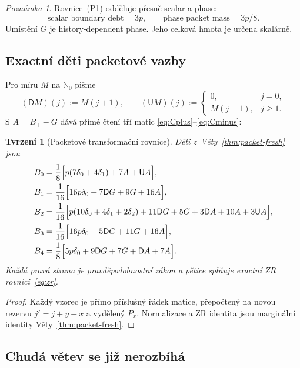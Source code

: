 \documentclass[11pt,a4paper]{article}
\newtheorem{proposition}[theorem]{Tvrzení}
\theoremstyle{definition}
\theoremstyle{remark}
\newtheorem{remark}[theorem]{Poznámka}
\newcommand{\Nzero}{\mathbb N_0}
\newcommand{\DOWN}{\mathsf D}
\newcommand{\UP}{\mathsf U}
\begin{document}
\begin{remark}
\label{rem:packet-scalar-phase}
Rovnice~(P1) odd\v eluje p\v resn\v e scalar a phase:
\[
\boxed{\text{scalar boundary debt}=3p,\qquad
       \text{phase packet mass}=3p/8.}
\]
Um\'ist\v en\'i $G$ je history-dependent phase. Jeho celkov\'a hmota je
ur\v cena skal\'arn\v e.
\end{remark}

\subsection{Exactn\'i d\v eti packetov\'e vazby}

Pro m\'iru $M$ na $\Nzero$ pi\v sme
\[
(\DOWN M)(j):=M(j+1),\qquad
(\UP M)(j):=
\begin{cases}
0,&j=0,\\
M(j-1),&j\ge1.
\end{cases}
\]
S $A=B_+-G$ d\'av\'a p\v r\'im\'e \v cten\'i t\v r\'i matic
\eqref{eq:Cplus}--\eqref{eq:Cminus}:

\begin{proposition}[Packetov\'e transforma\v cn\'i rovnice]
\label{prop:packet-children}
D\v eti z~V\v ety~\ref{thm:packet-fresh} jsou
\begin{align}
B_0&=\frac18\Bigl[p(7\delta_0+4\delta_1)+7A+\UP A\Bigr],
\label{eq:packet-B0}\\
B_1&=\frac1{16}\Bigl[16p\delta_0+7\DOWN G+9G+16A\Bigr],
\label{eq:packet-B1}\\
B_2&=\frac1{16}\Bigl[
p(10\delta_0+4\delta_1+2\delta_2)
+11\DOWN G+5G
+3\DOWN A+10A+3\UP A
\Bigr],
\label{eq:packet-B2}\\
B_3&=\frac1{16}\Bigl[16p\delta_0+5\DOWN G+11G+16A\Bigr],
\label{eq:packet-B3}\\
B_4&=\frac18\Bigl[
5p\delta_0+9\DOWN G+7G+\DOWN A+7A
\Bigr].
\label{eq:packet-B4}
\end{align}
Ka\v zd\'a prav\'a strana je pravd\v epodobnostn\'i z\'akon a p\v etice spl\v nuje
exactn\'i ZR rovnici~\eqref{eq:zr}.
\end{proposition}

\begin{proof}
Ka\v zd\'y vzorec je p\v r\'imo p\v r\'islu\v sn\'y \v r\'adek matice,
p\v repo\v cten\'y na novou rezervu $j'=j+y-x$ a vyd\v elen\'y $P_x$.
Normalizace a ZR identita jsou margin\'aln\'i identity
V\v ety~\ref{thm:packet-fresh}.
\end{proof}

\subsection{Chud\'a v\v etev se ji\v z nerozb\'ih\'a}
\end{document}
